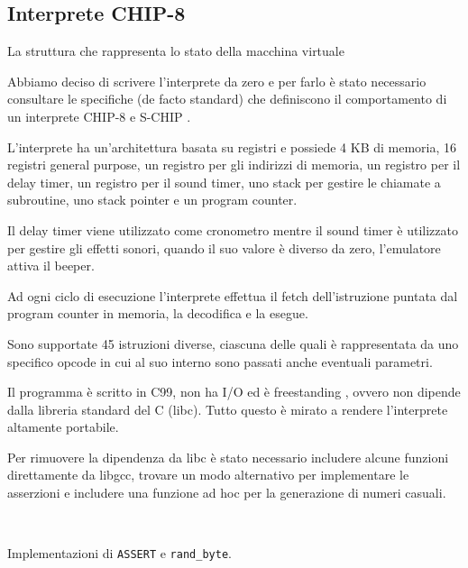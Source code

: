 \documentclass[a4paper]{article}
\begin{document}
\subsection{Interprete CHIP-8}

\begin{Listing}[h!t] %
    \centering
    \caption{La struttura che rappresenta lo stato della macchina virtuale}
    \label{chip8_struct}
\end{Listing}

Abbiamo deciso di scrivere l'interprete da zero e per farlo è stato necessario consultare
le specifiche (de facto standard) che definiscono il comportamento di un interprete CHIP-8
\cite{cowgod:chip8} e S-CHIP \cite{cowgod:schip}.

L'interprete ha un'architettura basata su registri e possiede 4 KB di memoria, 16 registri
general purpose, un registro per gli indirizzi di memoria, un registro per il delay timer,
un registro per il sound timer, uno stack per gestire le chiamate a subroutine, uno stack pointer
e un program counter.

Il delay timer viene utilizzato come cronometro mentre il sound
timer è utilizzato per gestire gli effetti sonori, quando il suo
valore è diverso da zero, l'emulatore attiva il beeper.

Ad ogni ciclo di esecuzione l'interprete effettua il fetch
dell'istruzione puntata dal program counter in memoria,
la decodifica e la esegue.

Sono supportate 45 istruzioni diverse, ciascuna delle
quali è rappresentata da uno specifico opcode in cui al suo interno
sono passati anche eventuali parametri.

Il programma è scritto in C99, non ha I/O ed è freestanding
\cite{n1256:conformance}, ovvero non dipende dalla libreria
standard del C (libc). Tutto questo è mirato a rendere l'interprete
altamente portabile.

Per rimuovere la dipendenza da libc è stato necessario includere
alcune funzioni direttamente da libgcc, trovare un modo alternativo
per implementare le asserzioni e includere una funzione ad hoc per
la generazione di numeri casuali.


\begin{Listing}[h!t]
    \centering
    \mbox{
        \quad
    }
    \caption{Implementazioni di \texttt{ASSERT} e \texttt{rand\_byte}.}
    \label{assert_rand}
\end{Listing}
\end{document}
